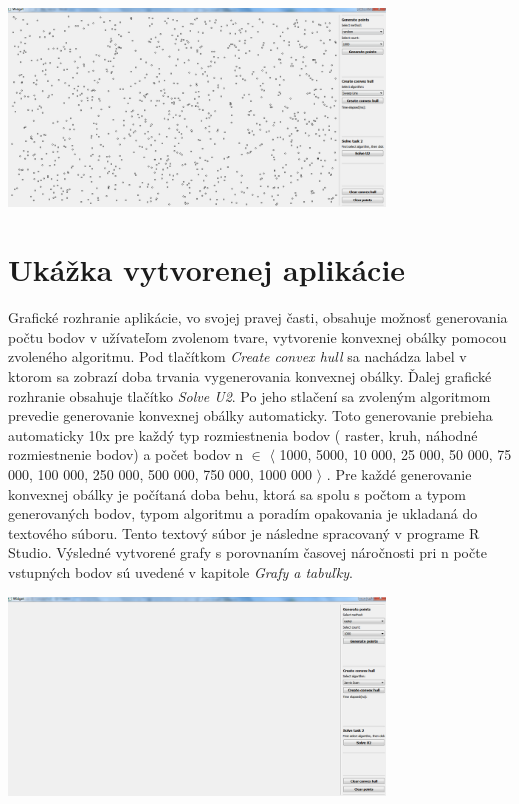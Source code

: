 \documentclass[12pt]{article}
\begin{document}
\begin{center}
   \includegraphics[width=10cm]{./img/points_generate_random_1000.png}
\end{center}

\clearpage 
\section{Ukážka vytvorenej aplikácie}

Grafické rozhranie aplikácie, vo svojej pravej časti, obsahuje možnosť generovania počtu bodov v užívateľom zvolenom tvare, vytvorenie konvexnej obálky pomocou zvoleného algoritmu. Pod tlačítkom \textit{Create convex hull} sa nachádza label v ktorom sa zobrazí doba trvania vygenerovania konvexnej obálky. Ďalej grafické rozhranie obsahuje tlačítko  \textit{Solve U2}. Po jeho stlačení sa zvoleným algoritmom prevedie generovanie konvexnej obálky automaticky. Toto generovanie prebieha automaticky 10x pre každý typ rozmiestnenia bodov ( raster, kruh, náhodné rozmiestnenie bodov) a počet bodov n $\in$ $\langle$ 1000, 5000, 10 000, 25 000, 50 000, 75 000, 100 000, 250 000, 500 000, 750 000, 1000 000 $\rangle$ . Pre každé generovanie konvexnej obálky je počítaná doba behu, ktorá sa spolu s počtom a typom generovaných bodov, typom algoritmu a poradím opakovania je ukladaná do textového súboru. Tento textový súbor je následne spracovaný v programe R Studio. Výsledné vytvorené grafy s porovnaním časovej náročnosti pri n počte vstupných bodov sú uvedené v kapitole \textit{Grafy a tabuľky}. 

\begin{center}
   \includegraphics[width=10cm]{./img/ukazka_aplikacia1.png}
\end{center}
\end{document}
